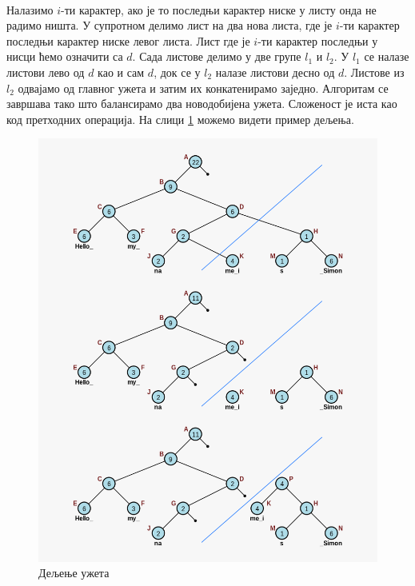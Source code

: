 \documentclass[12pt,oneside]{memoir}
\begin{document}
\paragraph{}
Налазимо \(i\)-ти карактер, ако је то последњи карактер ниске у листу онда не радимо ништа.
У супротном делимо лист на два нова листа, где је \(i\)-ти карактер последњи карактер ниске
левог листа. Лист где је \(i\)-ти карактер последњи у нисци ћемо означити са \(d\). Сада
листове делимо у две групе \(l_1\)  и \(l_2\). У \(l_1\) се налазе листови лево од \(d\) као и сам \(d\), док се у \(l_2\) налазе листови десно од \(d\). Листове из \(l_2\) одвајамо од 
главног ужета и затим их конкатенирамо заједно. Алгоритам се завршава тако што балансирамо 
два новодобијена ужета. Сложеност је иста као код претходних операција. На слици
\ref{fig:ropе_split} можемо видети пример дељења.

\begin{figure}
  \centering
  \includegraphics[width=1.0\textwidth]{images/rope_split.png}
  \caption{Дељење ужета}
  \label{fig:ropе_split}
\end{figure} 
\end{document}
